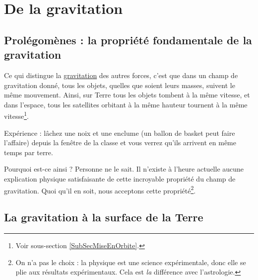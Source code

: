 \documentclass[a4paper,12pt]{book}
\theoremstyle{mes_exemples}	\newtheorem{exemple}[numtho]{Exemple}
\theoremstyle{mes_tho}
\begin{document}








\chapter{De la gravitation}


\section[Prolégomènes]{Prolégomènes : la propriété fondamentale de la gravitation}

Ce qui distingue la \href{http://fr.wikipedia.org/wiki/Gravitation}{gravitation} des autres forces, c'est que dans un champ de gravitation donné, tous les objets, quelles que soient leurs masses, suivent le même mouvement. Ainsi, sur Terre tous les objets tombent à la même vitesse, et dans l'espace, tous les satellites orbitant à la même hauteur tournent à la même vitesse\footnote{Voir sous-section \ref{SubSecMiseEnOrbite}.}.

Expérience : lâchez une noix et une enclume (un ballon de basket peut faire l'affaire) depuis la fenêtre de la classe et vous verrez qu'ils arrivent en même temps par terre.

Pourquoi est-ce ainsi ? Personne ne le sait. Il n'existe à l'heure actuelle aucune explication physique satisfaisante de cette incroyable propriété du champ de gravitation. Quoi qu'il en soit, nous acceptons cette propriété\footnote{On n'a pas le choix : la physique est une science expérimentale, donc elle se plie aux résultats expérimentaux. Cela est \emph{la} différence avec l'astrologie.}.

\section{La gravitation à la surface de la Terre}
\end{document}
